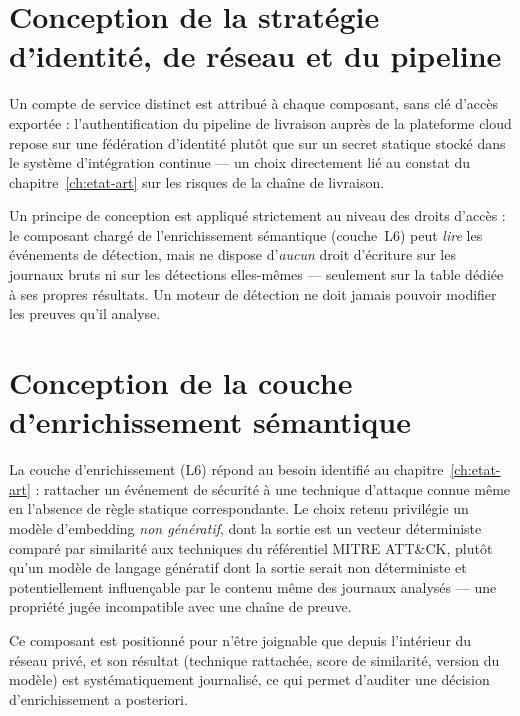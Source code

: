 \section{Conception de la stratégie d'identité, de réseau et du pipeline}

Un compte de service distinct est attribué à chaque composant, sans clé d'accès exportée :
l'authentification du pipeline de livraison auprès de la plateforme cloud repose sur une
fédération d'identité plutôt que sur un secret statique stocké dans le système
d'intégration continue --- un choix directement lié au constat du
chapitre~\ref{ch:etat-art} sur les risques de la chaîne de livraison.

\begin{alertbox}
Un principe de conception est appliqué strictement au niveau des droits d'accès : le
composant chargé de l'enrichissement sémantique (couche~L6) peut \emph{lire} les événements
de détection, mais ne dispose d'\emph{aucun} droit d'écriture sur les journaux bruts ni sur
les détections elles-mêmes --- seulement sur la table dédiée à ses propres résultats. Un
moteur de détection ne doit jamais pouvoir modifier les preuves qu'il analyse.
\end{alertbox}


\section{Conception de la couche d'enrichissement sémantique}

La couche d'enrichissement (L6) répond au besoin identifié au chapitre~\ref{ch:etat-art} :
rattacher un événement de sécurité à une technique d'attaque connue même en l'absence de
règle statique correspondante. Le choix retenu privilégie un modèle d'embedding
\emph{non génératif}, dont la sortie est un vecteur déterministe comparé par similarité aux
techniques du référentiel MITRE ATT\&CK, plutôt qu'un modèle de langage génératif dont la
sortie serait non déterministe et potentiellement influençable par le contenu même des
journaux analysés --- une propriété jugée incompatible avec une chaîne de preuve.

Ce composant est positionné pour n'être joignable que depuis l'intérieur du réseau privé, et
son résultat (technique rattachée, score de similarité, version du modèle) est systématiquement
journalisé, ce qui permet d'auditer une décision d'enrichissement a posteriori.

